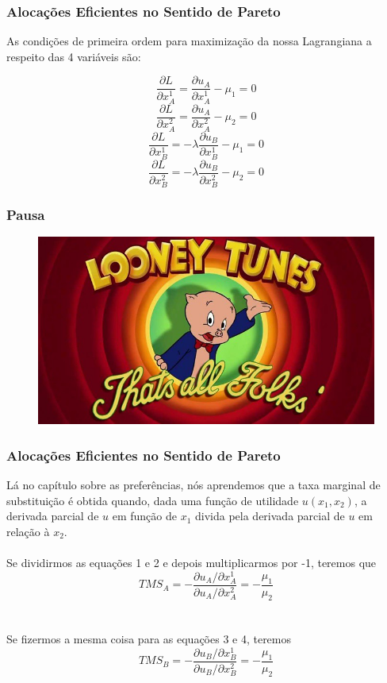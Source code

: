 \documentclass{beamer}[10]
\begin{document}
\begin{frame}
	\frametitle{Alocações Eficientes no Sentido de Pareto}

	As condições de primeira ordem para maximização da nossa Lagrangiana a respeito das 4 variáveis são:

	$$\frac{\partial L}{\partial x_A^1} = \frac{\partial u_A}{\partial x_A^1} - \mu_1 = 0$$
	$$\frac{\partial L}{\partial x_A^2} = \frac{\partial u_A}{\partial x_A^2} - \mu_2 = 0 $$
	$$\frac{\partial L}{\partial x_B^1} = -\lambda \frac{\partial u_B}{\partial x_B^1} - \mu_1 = 0 $$
	$$\frac{\partial L}{\partial x_B^2} = -\lambda \frac{\partial u_B}{\partial x_B^2} - \mu_2 = 0 $$

\end{frame}

\begin{frame}
	\frametitle{Pausa}

	\begin{figure}[H]
		\centering
		\colorbox{white}{\includegraphics[scale=0.425]{pausa.png}}
	\end{figure}		

\end{frame}


\begin{frame}
	\frametitle{Alocações Eficientes no Sentido de Pareto}

	Lá no capítulo sobre as preferências, nós aprendemos que a taxa marginal de substituição é obtida quando, dada uma função de utilidade $u(x_1,x_2)$, a derivada parcial de $u$ em função de $x_{1}$ divida pela derivada parcial de $u$ em relação à $x_{2}$.
	\\~\\
	Se dividirmos as equações 1 e 2 e depois multiplicarmos por -1, teremos que
	$$TMS_{A} = - \frac{\partial u_A / \partial x_{A}^1 }{\partial u_A / \partial x_{A}^2} = - \frac{\mu_{1} }{ \mu_{2} }$$
	\\~\\
	Se fizermos a mesma coisa para as equações 3 e 4, teremos
	$$TMS_{B} = - \frac{\partial u_B / \partial x_{B}^1 }{\partial u_B / \partial x_{B}^2} = - \frac{\mu_{1} }{ \mu_{2} }$$

\end{frame}
\end{document}
